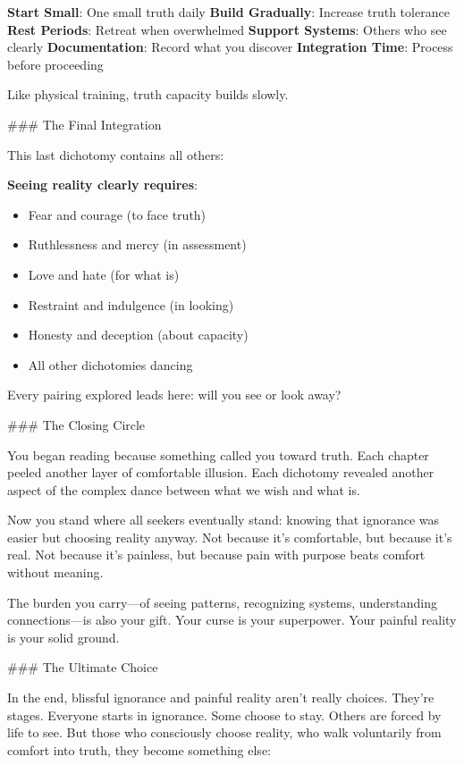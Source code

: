 \documentclass[12pt]{book}
\begin{document}
\textbf{Start Small}: One small truth daily
\textbf{Build Gradually}: Increase truth tolerance
\textbf{Rest Periods}: Retreat when overwhelmed
\textbf{Support Systems}: Others who see clearly
\textbf{Documentation}: Record what you discover
\textbf{Integration Time}: Process before proceeding

Like physical training, truth capacity builds slowly.

\#\#\# The Final Integration

This last dichotomy contains all others:

\textbf{Seeing reality clearly requires}:
\begin{itemize}
\item Fear and courage (to face truth)
\item Ruthlessness and mercy (in assessment)
\item Love and hate (for what is)
\item Restraint and indulgence (in looking)
\item Honesty and deception (about capacity)
\item All other dichotomies dancing

\end{itemize}
Every pairing explored leads here: will you see or look away?

\#\#\# The Closing Circle

You began reading because something called you toward truth. Each chapter peeled another layer of comfortable illusion. Each dichotomy revealed another aspect of the complex dance between what we wish and what is.

Now you stand where all seekers eventually stand: knowing that ignorance was easier but choosing reality anyway. Not because it's comfortable, but because it's real. Not because it's painless, but because pain with purpose beats comfort without meaning.

The burden you carry—of seeing patterns, recognizing systems, understanding connections—is also your gift. Your curse is your superpower. Your painful reality is your solid ground.

\#\#\# The Ultimate Choice

In the end, blissful ignorance and painful reality aren't really choices. They're stages. Everyone starts in ignorance. Some choose to stay. Others are forced by life to see. But those who consciously choose reality, who walk voluntarily from comfort into truth, they become something else:
\end{document}
